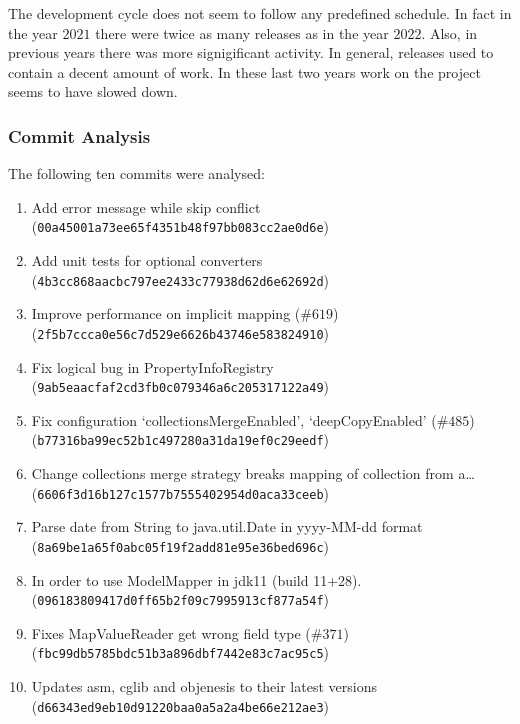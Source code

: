 \documentclass[12pt]{article}
\begin{document}
The development cycle does not seem to follow any predefined
schedule. In fact in the year $2021$ there were twice as many
releases as in the year $2022$. Also, in previous years there
was more signigificant activity. In general, releases used to
contain a decent amount of work. In these last two years work on
the project seems to have slowed down.

\subsubsection{Commit Analysis}

The following ten commits were analysed:

\begin{enumerate}
    \item Add error message while skip conflict
        (\texttt{00a45001a73ee65f4351b48f97bb083cc2ae0d6e})
    \item Add unit tests for optional converters
        (\texttt{4b3cc868aacbc797ee2433c77938d62d6e62692d})
    \item Improve performance on implicit mapping (\#$619$)
        \newline
        (\texttt{2f5b7ccca0e56c7d529e6626b43746e583824910})
    \item Fix logical bug in PropertyInfoRegistry
        (\texttt{9ab5eaacfaf2cd3fb0c079346a6c205317122a49})
    \item Fix configuration `collectionsMergeEnabled',
        `deepCopyEnabled' (\#$485$) \newline
        (\texttt{b77316ba99ec52b1c497280a31da19ef0c29eedf}) 
    \item Change collections merge strategy breaks mapping of
        collection from a\ldots \newline
        (\texttt{6606f3d16b127c1577b7555402954d0aca33ceeb})
    \item Parse date from String to java.util.Date in yyyy-MM-dd
        format \newline
        (\texttt{8a69be1a65f0abc05f19f2add81e95e36bed696c})
    \item In order to use ModelMapper in jdk11 (build 11+28).
        \newline
        (\texttt{096183809417d0ff65b2f09c7995913cf877a54f})
    \item Fixes MapValueReader get wrong field type (\#$371$)
        \newline
        (\texttt{fbc99db5785bdc51b3a896dbf7442e83c7ac95c5}) 
    \item Updates asm, cglib and objenesis to their latest
        versions \newline
        (\texttt{d66343ed9eb10d91220baa0a5a2a4be66e212ae3})
\end{enumerate}
\end{document}
